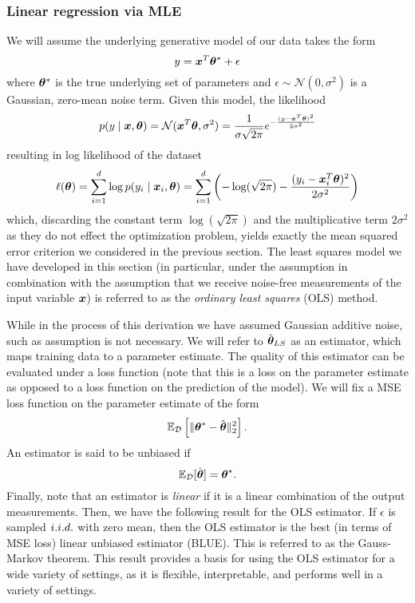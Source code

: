 \subsubsection{Linear regression via MLE}

We will assume the underlying generative model of our data takes the form
\begin{equation}
    y = \bm{x}^T \bm{\theta}^* + \epsilon
\end{equation}
where $\bm{\theta}^*$ is the true underlying set of parameters and $\epsilon \sim \mathcal{N}(0, \sigma^2)$ is a Gaussian, zero-mean noise term. Given this model, the likelihood 
\begin{equation}
    p(y \mid \bm{x}, \bm{\theta}) = \mathcal{N}(\bm{x}^T \bm{\theta}, \sigma^2) = \frac{1}{\sigma \sqrt{2 \pi}} e^{-\frac{(y - \bm{x}^T \bm{\theta})^2}{2 \sigma^2}}
\end{equation}
resulting in log likelihood of the dataset
\begin{equation}
    \ell(\bm{\theta}) = \sum_{i=1}^{d} \log p(y_i \mid \bm{x}_i, \bm{\theta})
    = \sum_{i=1}^{d} \left(-\log(\sqrt{2 \pi}) -\frac{(y_i - \bm{x}_i^T \bm{\theta})^2}{2 \sigma^2} \right)
\end{equation}
which, discarding the constant term $\log(\sqrt{2 \pi})$ and the multiplicative term $2 \sigma^2$ as they do not effect the optimization problem, yields exactly the mean squared error criterion we considered in the previous section. The least squares model we have developed in this section (in particular, under the \iid assumption in combination with the assumption that we receive noise-free measurements of the input variable $\bm{x}$) is referred to as the \textit{ordinary least squares} (OLS) method.

While in the process of this derivation we have assumed Gaussian additive noise, such as assumption is not necessary. We will refer to $\hat{\bm{\theta}}_{LS}$ as an estimator, which maps training data to a parameter estimate. The quality of this estimator can be evaluated under a loss function (note that this is a loss on the parameter estimate as opposed to a loss function on the prediction of the model). We will fix a MSE loss function on the parameter estimate of the form
\begin{equation}
    \mathbb{E}_{\mathcal{D}}\left[ \|\bm{\theta}^* - \hat{\bm{\theta}} \|^2_2\right].
\end{equation}
An estimator is said to be unbiased if 
\begin{equation}
    \mathbb{E}_{\mathcal{D}}[ \hat{\bm{\theta}} ] = \bm{\theta}^*.
\end{equation}
Finally, note that an estimator is \textit{linear} if it is a linear combination of the output measurements. 
Then, we have the following result for the OLS estimator. If $\epsilon$ is sampled $i.i.d.$ with zero mean, then the OLS estimator is the best (in terms of MSE loss) linear unbiased estimator (BLUE). This is referred to as the Gauss-Markov theorem. This result provides a basis for using the OLS estimator for a wide variety of settings, as it is flexible, interpretable, and performs well in a variety of settings. 

